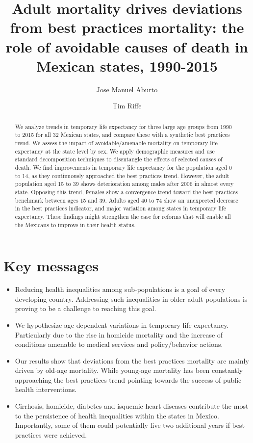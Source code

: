\documentclass{article}
\title{ Adult mortality drives deviations from best practices mortality: the role of avoidable causes of death in Mexican states, 1990-2015}
\author[1]{Jose Manuel Aburto}
\author[2]{Tim Riffe}
\affil[1]{European Doctoral School of Demography}
\affil[1,2]{Max Planck Institute for Demographic Research}
\begin{document}
\maketitle

\begin{abstract}
We analyze trends in temporary life expectancy for three large age groups from 1990 to 2015 for all 32 Mexican states, and compare these with a synthetic best practices trend. We assess the impact of avoidable/amenable mortality on temporary life expectancy at the state level by sex. We apply demographic measures and use standard decomposition techniques to disentangle the effects of selected causes of death. We find improvements in temporary life expectancy for the population aged 0 to 14, as they continuously approached the best practices trend. However, the adult population aged 15 to 39 shows deterioration among males after 2006 in almost every state. Opposing this trend, females show a convergence trend toward the best practices benchmark between ages 15 and 39. Adults aged 40 to 74 show an unexpected decrease in the best practices indicator, and major variation among states in temporary life expectancy. These findings might strengthen the case for reforms that will enable all the Mexicans to improve in their health status.
​



\end{abstract}

\section*{Key messages}
\begin{itemize}
\item Reducing health inequalities among sub-populations is a goal of every developing country. Addressing such inequalities in older adult populations is proving to be a challenge to reaching this goal.
\item We hypothesize age-dependent variations in temporary life expectancy. Particularly due to the rise in homicide mortality and the increase of conditions amenable to medical services and policy/behavior actions.
\item Our results show that deviations from the best practices mortality are mainly driven by old-age mortality. While young-age mortality has been constantly approaching the best practices trend pointing towards the success of public health interventions.
\item Cirrhosis, homicide, diabetes and isquemic heart diseases contribute the most to the persistence of health inequalities within the states in Mexico. Importantly, some of them could potentially live two additional years if best practices were achieved. 
\end{itemize}
\end{document}
